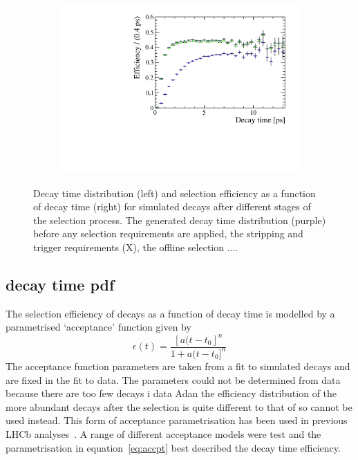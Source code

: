 \begin{figure}[htbp]
\begin{subfigure}[b]{0.48\textwidth}
       \includegraphics[width=\textwidth]{./Figs/LifetimeMeasurement/Accpt.pdf}
   \end{subfigure}
    \caption{Decay time distribution (left) and selection efficiency as a function of decay time (right) for \bsmumu simulated decays after different stages of the selection process. The generated decay time distribution (purple) before any selection requirements are applied, the stripping and trigger requirements (X), the offline selection ....}
    \label{fig:accpteg}
\end{figure}

\subsection{\bsmumu decay time pdf}
\label{sec:signalDTpdf}
The selection efficiency of \bsmumu decays as a function of decay time is modelled by a parametrised `acceptance' function given by
\begin{equation}
\epsilon(t) = \frac{[a(t - t_{0}]^{n}}{1 + a(t - t_{0}]^{n}}
\label{eq:accpt}
\end{equation}
The acceptance function parameters are taken from a fit to simulated \bsmumu decays and are fixed in the fit to data. The parameters could not be determined from data because there are too few \bsmumu decays i data Adan the efficiency distribution of the more abundant \bhh decays after the selection is quite different to that of \bsmumu so cannot be used instead. This form of acceptance parametrisation has been used in previous LHCb analyses~\cite{}. A range of different acceptance models were test and the parametrisation in equation~\ref{eq:accpt} best described the decay time efficiency.


